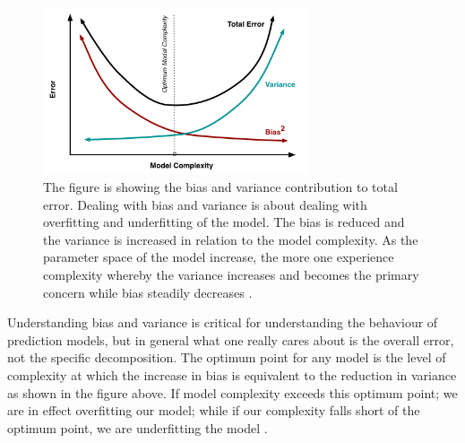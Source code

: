 \begin{figure}[H]
  \centering
    \includegraphics[width=0.7\textwidth]{images/biasvariance.png}
    \caption{The figure is showing the bias and variance contribution to total error. Dealing with bias and variance is about dealing with overfitting and underfitting of the model. The bias is reduced and the variance is increased in relation to the model complexity. As the parameter space of the model increase, the more one experience  complexity whereby the variance increases and becomes the primary concern while bias steadily decreases \citep{fortmann2012understanding}.}  
\end{figure}

Understanding bias and variance is critical for understanding the behaviour of prediction models, but in general what one really cares about is the overall error, not the specific decomposition. The optimum point for any model is the level of complexity at which the increase in bias is equivalent to the reduction in variance as shown in the figure above. If model complexity exceeds this optimum point; we are in effect overfitting our model; while if our complexity falls short of the optimum point, we are underfitting the model \citep{fortmann2012understanding}.

